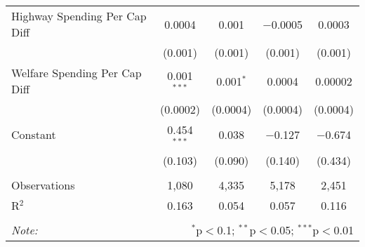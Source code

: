 \begin{table}[!htbp]
\begin{tabular}{@{\extracolsep{5pt}}lcccc}
  Highway Spending Per Cap Diff & 0.0004 & 0.001 & $-$0.0005 & 0.0003 \\ 
  & (0.001) & (0.001) & (0.001) & (0.001) \\ 
  Welfare Spending Per Cap Diff & 0.001$^{***}$ & 0.001$^{*}$ & 0.0004 & 0.00002 \\ 
  & (0.0002) & (0.0004) & (0.0004) & (0.0004) \\ 
  Constant & 0.454$^{***}$ & 0.038 & $-$0.127 & $-$0.674 \\ 
  & (0.103) & (0.090) & (0.140) & (0.434) \\ 
 \hline \\[-1.8ex] 
Observations & 1,080 & 4,335 & 5,178 & 2,451 \\ 
R$^{2}$ & 0.163 & 0.054 & 0.057 & 0.116 \\ 
\hline 
\hline \\[-1.8ex] 
\textit{Note:}  & \multicolumn{4}{r}{$^{*}$p$<$0.1; $^{**}$p$<$0.05; $^{***}$p$<$0.01} \\ 
\end{tabular} 
\end{table} 
